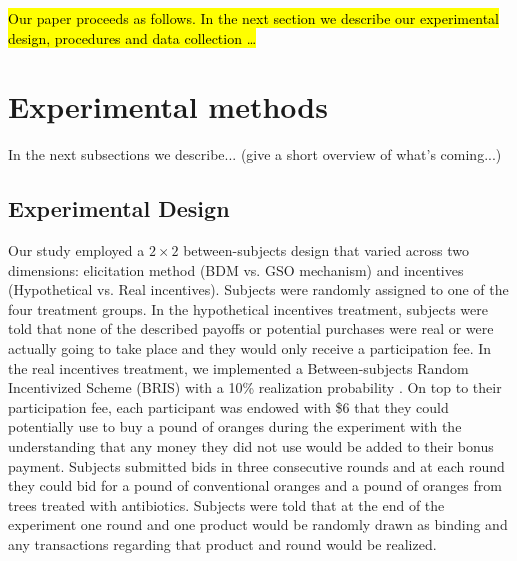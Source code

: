 \documentclass[12pt]{article}
\begin{document}
\hl{Our paper proceeds as follows. In the next section we describe our experimental design, procedures and data collection \ldots}

\section{Experimental methods}
In the next subsections we describe... (give a short overview of what's coming...)

\subsection{Experimental Design}
Our study employed a $2\times2$ between-subjects design that varied across two dimensions: elicitation method (BDM vs. GSO mechanism) and incentives (Hypothetical vs. Real incentives). Subjects were randomly assigned to one of the four treatment groups. In the hypothetical incentives treatment, subjects were told that none of the described payoffs or potential purchases were real or were actually going to take place and they would only receive a participation fee. In the real incentives treatment, we implemented a Between-subjects Random Incentivized Scheme (BRIS) with a 10\% realization probability \citep{ahles_testing_2024}. On top to their participation fee, each participant was endowed with \$6 that they could potentially use to buy a pound of oranges during the experiment with the understanding that any money they did not use would be added to their bonus payment. Subjects submitted bids in three consecutive rounds and at each round they could bid for a pound of conventional oranges and a pound of oranges from trees treated with antibiotics. Subjects were told that at the end of the experiment one round and one product would be randomly drawn as binding and any transactions regarding that product and round would be realized. 

\end{document}
